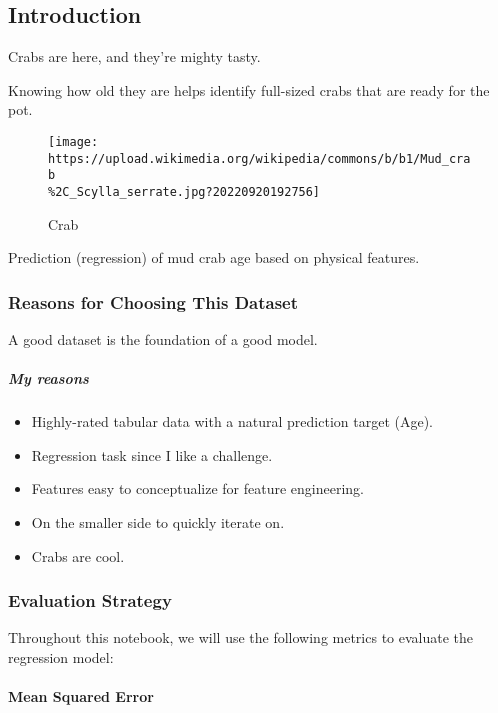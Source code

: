 \documentclass[11pt]{article}
\providecommand{\tightlist}{%
      \setlength{\itemsep}{0pt}\setlength{\parskip}{0pt}}
\begin{document}
    \subsection{Introduction}\label{introduction}

Crabs are here, and they're mighty tasty.

Knowing how old they are helps identify full-sized crabs that are ready
for the pot.

\begin{figure}
\centering
\texttt{[image: https://upload.wikimedia.org/wikipedia/commons/b/b1/Mud\_crab\\\%2C\_Scylla\_serrate.jpg?20220920192756]}
\caption{Crab}
\end{figure}

Prediction (regression) of mud crab age based on physical features.

\subsubsection{Reasons for Choosing This
Dataset}\label{reasons-for-choosing-this-dataset}

A good dataset is the foundation of a good model.

\subparagraph{My reasons}\label{my-reasons}

\begin{itemize}
\tightlist
\item
  Highly-rated tabular data with a natural prediction target (Age).
\item
  Regression task since I like a challenge.
\item
  Features easy to conceptualize for feature engineering.
\item
  On the smaller side to quickly iterate on.
\item
  Crabs are cool.
\end{itemize}

\subsubsection{Evaluation Strategy}\label{evaluation-strategy}

Throughout this notebook, we will use the following metrics to evaluate
the regression model:

\paragraph{Mean Squared Error}\label{mean-squared-error}
\end{document}
